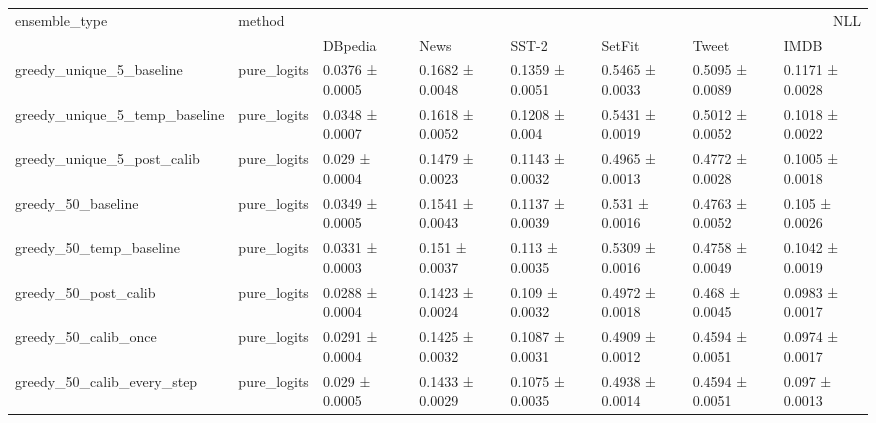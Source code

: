 \begin{tabular}{llllllll}
\toprule
ensemble_type & method & \multicolumn{6}{r}{NLL} \\
 &  & DBpedia & News & SST-2 & SetFit & Tweet & IMDB \\
\midrule
greedy_unique_5_baseline & pure_logits & 0.0376 ± 0.0005 & 0.1682 ± 0.0048 & 0.1359 ± 0.0051 & 0.5465 ± 0.0033 & 0.5095 ± 0.0089 & 0.1171 ± 0.0028 \\
greedy_unique_5_temp_baseline & pure_logits & 0.0348 ± 0.0007 & 0.1618 ± 0.0052 & 0.1208 ± 0.004 & 0.5431 ± 0.0019 & 0.5012 ± 0.0052 & 0.1018 ± 0.0022 \\
greedy_unique_5_post_calib & pure_logits & 0.029 ± 0.0004 & 0.1479 ± 0.0023 & 0.1143 ± 0.0032 & 0.4965 ± 0.0013 & 0.4772 ± 0.0028 & 0.1005 ± 0.0018 \\
greedy_50_baseline & pure_logits & 0.0349 ± 0.0005 & 0.1541 ± 0.0043 & 0.1137 ± 0.0039 & 0.531 ± 0.0016 & 0.4763 ± 0.0052 & 0.105 ± 0.0026 \\
greedy_50_temp_baseline & pure_logits & 0.0331 ± 0.0003 & 0.151 ± 0.0037 & 0.113 ± 0.0035 & 0.5309 ± 0.0016 & 0.4758 ± 0.0049 & 0.1042 ± 0.0019 \\
greedy_50_post_calib & pure_logits & 0.0288 ± 0.0004 & 0.1423 ± 0.0024 & 0.109 ± 0.0032 & 0.4972 ± 0.0018 & 0.468 ± 0.0045 & 0.0983 ± 0.0017 \\
greedy_50_calib_once & pure_logits & 0.0291 ± 0.0004 & 0.1425 ± 0.0032 & 0.1087 ± 0.0031 & 0.4909 ± 0.0012 & 0.4594 ± 0.0051 & 0.0974 ± 0.0017 \\
greedy_50_calib_every_step & pure_logits & 0.029 ± 0.0005 & 0.1433 ± 0.0029 & 0.1075 ± 0.0035 & 0.4938 ± 0.0014 & 0.4594 ± 0.0051 & 0.097 ± 0.0013 \\
\bottomrule
\end{tabular}
